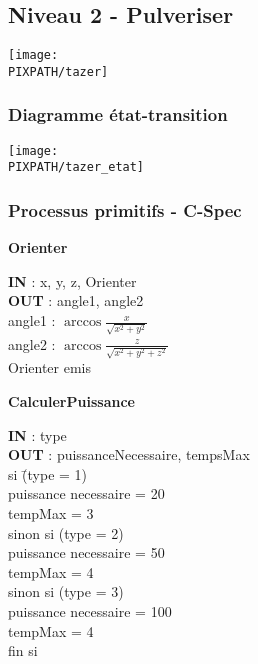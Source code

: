 \subsection{Niveau 2 - Pulveriser}

\begin{center}
\texttt{[image: \\PIXPATH/tazer]}
\end{center}


\subsubsection{Diagramme état-transition}

\begin{center}
\texttt{[image: \\PIXPATH/tazer\_etat]}
\end{center}

\vfill
\pagebreak

\subsubsection{Processus primitifs - C-Spec}

\begin{description}
	
	\item \textbf{Orienter}
		\begin{tabbing} 
		\textbf{IN} : x, y, z, Orienter \\
		\textbf{OUT} : angle1, angle2 \\
		angle1 : $\arccos{\frac{x}{\sqrt{x^2+y^2}}}$ \\
		angle2 : $\arccos{\frac{z}{\sqrt{x^2+y^2+z^2}}}$ \\
		Orienter emis
		\end{tabbing}

	\item \textbf{CalculerPuissance}
		\begin{tabbing} 
		\textbf{IN} : type \\
		\textbf{OUT} : puissanceNecessaire, tempsMax \\
		si \=(type = 1) \\
			\>puissance necessaire = 20 \\
			\>tempMax = 3 \\
		sinon si (type = 2) \\
			\>puissance necessaire = 50 \\
			\>tempMax = 4 \\
		sinon si (type = 3) \\
			\>puissance necessaire = 100 \\
			\>tempMax = 4 \\
		fin si
		\end{tabbing} 


\end{description}

\vfill
\pagebreak

